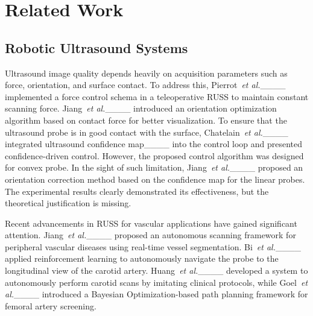 \section{Related Work}
\subsection{Robotic Ultrasound Systems}
Ultrasound image quality depends heavily on acquisition parameters such as force, orientation, and surface contact. To address this, Pierrot~\emph{et al.}____ implemented a force control schema in a teleoperative RUSS to maintain constant scanning force. Jiang~\emph{et al.}____ introduced an orientation optimization algorithm based on contact force for better visualization.
To ensure that the ultrasound probe is in good contact with the surface, Chatelain~\emph{et al.}____ integrated ultrasound confidence map____ into the control loop and presented confidence-driven control. However, the proposed control algorithm was designed for convex probe. In the sight of such limitation, Jiang~\emph{et al.}____ proposed an orientation correction method based on the confidence map for the linear probes. The experimental results clearly demonstrated its effectiveness, but the theoretical justification is missing.

\par
Recent advancements in RUSS for vascular applications have gained significant attention. Jiang~\emph{et al.}____ proposed an autonomous scanning framework for peripheral vascular diseases using real-time vessel segmentation. Bi~\emph{et al.}____ applied reinforcement learning to autonomously navigate the probe to the longitudinal view of the carotid artery. Huang~\emph{et al.}____ developed a system to autonomously perform carotid scans by imitating clinical protocols, while Goel~\emph{et al.}____ introduced a Bayesian Optimization-based path planning framework for femoral artery screening.

\par
{}

